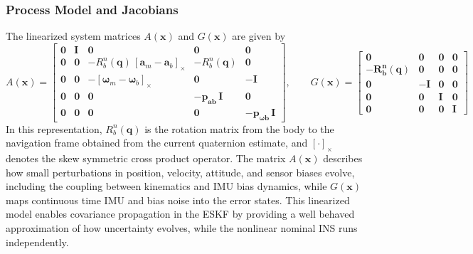 \subsubsection{Process Model and Jacobians}
The linearized system matrices $A(\mathbf{x})$ and $G(\mathbf{x})$ are given by
\begin{equation}
    A(\mathbf{x}) =
    \begin{bmatrix}
        \mathbf{0} & \mathbf{I} & \mathbf{0} & \mathbf{0} & \mathbf{0} \\
        \mathbf{0} & \mathbf{0} & -R_b^n(\mathbf{q})\,[\mathbf{a}_m - \mathbf{a}_{b}]_\times & -R_b^n(\mathbf{q}) & \mathbf{0} \\
        \mathbf{0} & \mathbf{0} & -[\boldsymbol{\omega}_m - \mathbf{\omega}_b]_\times & \mathbf{0} & -\mathbf{I} \\
        \mathbf{0} & \mathbf{0} & \mathbf{0} & \mathbf{-p_{\mathbf{a}b}\,I} & \mathbf{0} \\
        \mathbf{0} & \mathbf{0} & \mathbf{0} & \mathbf{0} & \mathbf{-p_{\mathbf{\omega}b}\,I}
    \end{bmatrix},
    \qquad
    G(\mathbf{x}) =
    \begin{bmatrix}
        \mathbf{0} & \mathbf{0} & \mathbf{0} & \mathbf{0} \\
        \mathbf{-R_b^n(\mathbf{q})} & \mathbf{0} & \mathbf{0} & \mathbf{0} \\
        \mathbf{0} & \mathbf{-I} & \mathbf{0} & \mathbf{0} \\
        \mathbf{0} & \mathbf{0} & \mathbf{I} & \mathbf{0} \\
        \mathbf{0} & \mathbf{0} & \mathbf{0} & \mathbf{I}
    \end{bmatrix}
    \label{eq:state-estimation-error-state-linear-time-varying-matrices}
\end{equation}
In this representation, $R_b^n(\mathbf{q})$ is the rotation matrix from the body to the navigation frame obtained from the current quaternion estimate, and $[\cdot]_\times$ denotes the skew symmetric cross product operator. The matrix $A(\mathbf{x})$ describes how small perturbations in position, velocity, attitude, and sensor biases evolve, including the coupling between kinematics and IMU bias dynamics, while $G(\mathbf{x})$ maps continuous time IMU and bias noise into the error states. This linearized model enables covariance propagation in the ESKF by providing a well behaved approximation of how uncertainty evolves, while the nonlinear nominal INS runs independently.



